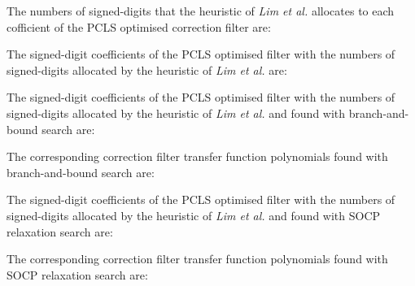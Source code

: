 \documentclass[a4paper,twoside,10pt,english]{article}
\begin{document}
The numbers of signed-digits that the heuristic of \emph{Lim et al.} allocates to
each cofficient of the PCLS optimised correction filter are:
\begin{small}


\end{small}

The signed-digit coefficients of the PCLS optimised filter with the
numbers of signed-digits allocated by the heuristic of \emph{Lim et al.} are:
\begin{small}


\end{small}

The signed-digit coefficients of the PCLS optimised filter with the
numbers of signed-digits allocated by the heuristic of \emph{Lim et al.} and
found with branch-and-bound search are:
\begin{small}


\end{small}
The corresponding correction filter transfer function polynomials found with
branch-and-bound search are:
\begin{small}


\end{small}

The signed-digit coefficients of the PCLS optimised filter with the
numbers of signed-digits allocated by the heuristic of \emph{Lim et al.} and
found with SOCP relaxation search are:
\begin{small}


\end{small}
The corresponding correction filter transfer function polynomials found with
SOCP relaxation search are:
\begin{small}


\end{small}
\end{document}

